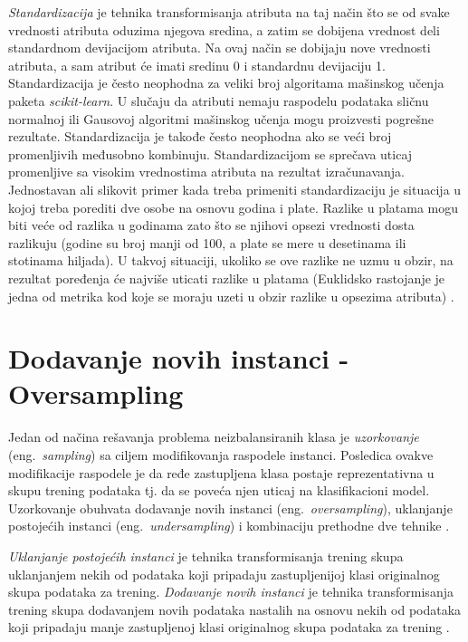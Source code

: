 \documentclass[12pt,oneside]{memoir}
\begin{document}
\textit{Standardizacija} je tehnika transformisanja atributa na taj način što se od svake vrednosti atributa oduzima njegova sredina, a zatim se dobijena vrednost deli standardnom devijacijom atributa. Na ovaj način se dobijaju nove vrednosti atributa, a sam atribut će imati sredinu 0 i standardnu devijaciju 1. Standardizacija je često neophodna za veliki broj algoritama mašinskog učenja paketa \textit{scikit-learn}. U slučaju da atributi nemaju raspodelu podataka sličnu normalnoj ili Gausovoj algoritmi mašinskog učenja mogu proizvesti pogrešne rezultate. Standardizacija je takođe često neophodna ako se veći broj promenljivih međusobno kombinuju. Standardizacijom se sprečava uticaj promenljive sa visokim vrednostima atributa na rezultat izračunavanja. Jednostavan ali slikovit primer kada treba primeniti standardizaciju je situacija u kojoj treba porediti dve osobe na osnovu godina i plate. Razlike u platama mogu biti veće od razlika u godinama zato što se njihovi opsezi vrednosti dosta razlikuju (godine su broj manji od 100, a plate se mere u desetinama ili stotinama hiljada). U takvoj situaciji, ukoliko se ove razlike ne uzmu u obzir, na rezultat poređenja će najviše uticati razlike u platama (Euklidsko rastojanje je jedna od metrika kod koje se moraju uzeti u obzir razlike u opsezima atributa) \cite{ sklearn_preprocessing, mlm2, mitic}. 

\section{Dodavanje novih instanci - Oversampling}

Jedan od načina rešavanja problema neizbalansiranih klasa je \textit{uzorkovanje} (eng.~\textit{sampling}) sa ciljem modifikovanja raspodele instanci. Posledica ovakve modifikacije raspodele je da ređe zastupljena klasa postaje reprezentativna u skupu trening podataka tj. da se poveća njen uticaj na klasifikacioni model. Uzorkovanje obuhvata dodavanje novih instanci (eng.~\textit{oversampling}), uklanjanje postojećih instanci (eng.~\textit{undersampling}) i kombinaciju prethodne dve tehnike \cite{mitic, aggarwal}. 

\textit{Uklanjanje postojećih instanci} je tehnika transformisanja trening skupa uklanjanjem nekih od podataka koji pripadaju zastupljenijoj klasi originalnog skupa podataka za trening. \textit{Dodavanje novih instanci} je tehnika transformisanja trening skupa dodavanjem novih podataka nastalih na osnovu nekih od podataka koji pripadaju manje zastupljenoj klasi originalnog skupa podataka za trening \cite{mitic}. 
\end{document}
